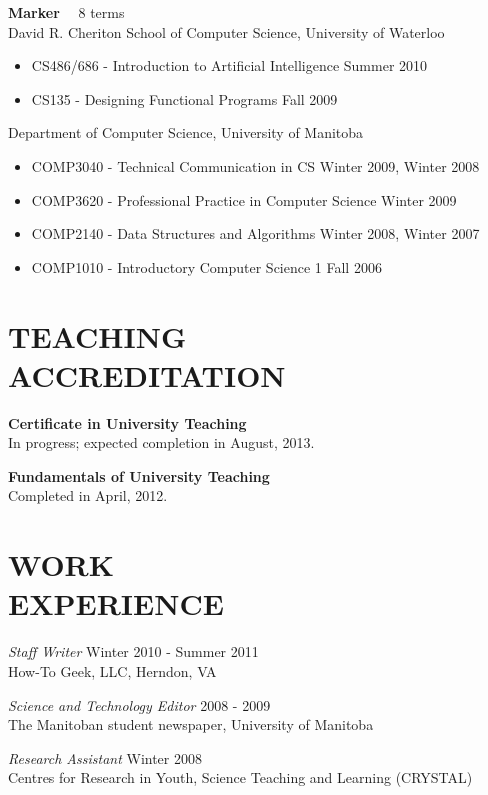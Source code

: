 \documentclass[line,margin]{res}
\begin{document}
\begin{resume}
{\bf Marker} ~~8 terms \vspace{4pt} \\
David R. Cheriton School of Computer Science, University of Waterloo
\begin{itemize}  \itemsep -2pt
  \item CS486/686 - Introduction to Artificial Intelligence \hfill Summer 2010
  \item CS135 - Designing Functional Programs \hfill Fall 2009
\end{itemize} \vspace{-4pt}
Department of Computer Science, University of Manitoba
\begin{itemize}  \itemsep -2pt
  \item COMP3040 - Technical Communication in CS \hfill Winter 2009, Winter 2008
  \item COMP3620 - Professional Practice in Computer Science \hfill Winter 2009
  \item COMP2140 - Data Structures and Algorithms \hfill Winter 2008, Winter 2007
  \item COMP1010 - Introductory Computer Science 1 \hfill Fall 2006
\end{itemize}

\section{TEACHING \\ACCREDITATION}

{\bf Certificate in University Teaching} \\
In progress; expected completion in August, 2013.

{\bf Fundamentals of University Teaching} \\
Completed in April, 2012.

\section{WORK \\EXPERIENCE}

{\sl Staff Writer} \hfill Winter 2010 - Summer 2011 \\
How-To Geek, LLC, Herndon, VA

{\sl Science and Technology Editor} \hfill 2008 - 2009 \\
The Manitoban student newspaper, University of Manitoba

{\sl Research Assistant} \hfill Winter 2008 \\
Centres for Research in Youth, Science Teaching and Learning (CRYSTAL)


\end{resume}
\end{document}
